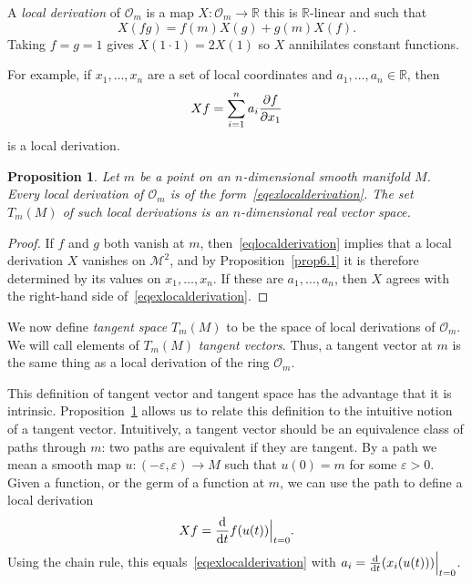 \documentclass[12pt,reqno]{book}%
\newtheorem{proposition}{Proposition}[chapter]
\theoremstyle{definition}
\theoremstyle{remark}
\theoremstyle{theorem}
\theoremstyle{remark}
\begin{document}
A \emph{local derivation} of $\mathcal{O}_m$ is a map $X : \mathcal{O}_m \to \mathbb{R}$ this is $\mathbb{R}$-linear and such that
\begin{equation}\label{eqlocalderivation}
    X(fg) = f(m)X(g) + g(m)X(f).
\end{equation}
Taking $f = g = 1$ gives $X(1 \cdot 1) = 2X(1)$ so $X$ annihilates constant functions.

For example, if $x_1, \ldots, x_n$ are a set of local coordinates and $a_1, \ldots, a_n \in \mathbb{R}$, then
\begin{equation}\label{eqexlocalderivation}
    Xf = \sum_{i = 1}^{n} a_i \pdv{f}{x_1}(m)
\end{equation}
is a local derivation.

\begin{proposition}\label{prop6.2}%
    Let $m$ be a point on an $n$-dimensional smooth manifold $M$.
    Every local derivation of $\mathcal{O}_m$ is of the form~\eqref{eqexlocalderivation}.
    The set $T_m(M)$ of such local derivations is an $n$-dimensional real vector space.
\end{proposition}%
\begin{proof}%
    If $f$ and $g$ both vanish at $m$, then~\eqref{eqlocalderivation} implies that a local derivation $X$ vanishes on $\mathcal{M}^2$, and by Proposition~\ref{prop6.1} it is therefore determined by its values on $x_1, \ldots, x_n$.
    If these are $a_1, \ldots, a_n$, then $X$ agrees with the right-hand side of~\eqref{eqexlocalderivation}.
\end{proof}%

We now define \emph{tangent space} $T_m(M)$ to be the space of local derivations of $\mathcal{O}_m$.
We will call elements of $T_m(M)$ \emph{tangent vectors}.
Thus, a tangent vector at $m$ is the same thing as a local derivation of the ring $\mathcal{O}_m$.

This definition of tangent vector and tangent space has the advantage that it is intrinsic.
Proposition~\ref{prop6.2} allows us to relate this definition to the intuitive notion of a tangent vector.
Intuitively, a tangent vector should be an equivalence class of paths through $m$: two paths are equivalent if they are tangent.
By a path we mean a smooth map $u : (-\varepsilon, \varepsilon) \to M$ such that $u(0) = m$ for some $\varepsilon > 0$.
Given a function, or the germ of a function at $m$, we can use the path to define a local derivation
\begin{equation}\label{eqlocalderivationofgerm}
    Xf = \dv{t}f(u(t))\Big|_{t = 0}.
\end{equation}
Using the chain rule, this equals~\eqref{eqexlocalderivation} with $a_i = \dv{t}(x_i(u(t)))\Big|_{t = 0}$.
\end{document}
